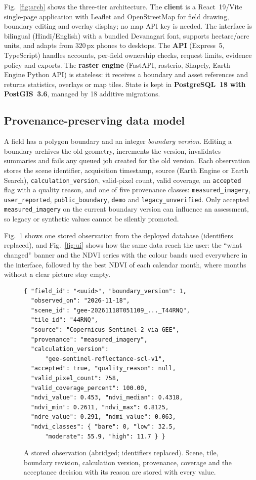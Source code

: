 \documentclass[conference]{IEEEtran}
\begin{document}
Fig.~\ref{fig:arch} shows the three-tier architecture. The \textbf{client} is a React~19/Vite single-page application with Leaflet and OpenStreetMap for field drawing, boundary editing and overlay display; no map API key is needed. The interface is bilingual (Hindi/English) with a bundled Devanagari font, supports hectare/acre units, and adapts from 320\,px phones to desktops. The \textbf{API} (Express~5, TypeScript) handles accounts, per-field ownership checks, request limits, evidence policy and exports. The \textbf{raster engine} (FastAPI, rasterio, Shapely, Earth Engine Python API) is stateless: it receives a boundary and asset references and returns statistics, overlays or map tiles. State is kept in \textbf{PostgreSQL~18 with PostGIS~3.6}, managed by 18 additive migrations.

\subsection{Provenance-preserving data model}
A field has a polygon boundary and an integer \emph{boundary version}. Editing a boundary archives the old geometry, increments the version, invalidates summaries and fails any queued job created for the old version. Each observation stores the scene identifier, acquisition timestamp, source (Earth Engine or Earth Search), \texttt{calculation\_version}, valid-pixel count, valid coverage, an \texttt{accepted} flag with a quality reason, and one of five provenance classes: \texttt{measured\_imagery}, \texttt{user\_reported}, \texttt{public\_boundary}, \texttt{demo} and \texttt{legacy\_unverified}. Only accepted \texttt{measured\_imagery} on the current boundary version can influence an assessment, so legacy or synthetic values cannot be silently promoted.

Fig.~\ref{fig:record} shows one stored observation from the deployed database (identifiers replaced), and Fig.~\ref{fig:ui} shows how the same data reach the user: the ``what changed'' banner and the NDVI series with the colour bands used everywhere in the interface, followed by the best NDVI of each calendar month, where months without a clear picture stay empty.

\begin{figure}[t]
\centering
\scriptsize
\begin{verbatim}
{ "field_id": "<uuid>", "boundary_version": 1,
  "observed_on": "2026-11-18",
  "scene_id": "gee-20261118T051109_..._T44RNQ",
  "tile_id": "44RNQ",
  "source": "Copernicus Sentinel-2 via GEE",
  "provenance": "measured_imagery",
  "calculation_version":
      "gee-sentinel-reflectance-scl-v1",
  "accepted": true, "quality_reason": null,
  "valid_pixel_count": 758,
  "valid_coverage_percent": 100.00,
  "ndvi_value": 0.453, "ndvi_median": 0.4318,
  "ndvi_min": 0.2611, "ndvi_max": 0.8125,
  "ndre_value": 0.291, "ndmi_value": 0.063,
  "ndvi_classes": { "bare": 0, "low": 32.5,
      "moderate": 55.9, "high": 11.7 } }
\end{verbatim}
\caption{A stored observation (abridged; identifiers replaced). Scene, tile, boundary revision, calculation version, provenance, coverage and the acceptance decision with its reason are stored with every value.}
\label{fig:record}
\end{figure}
\end{document}
